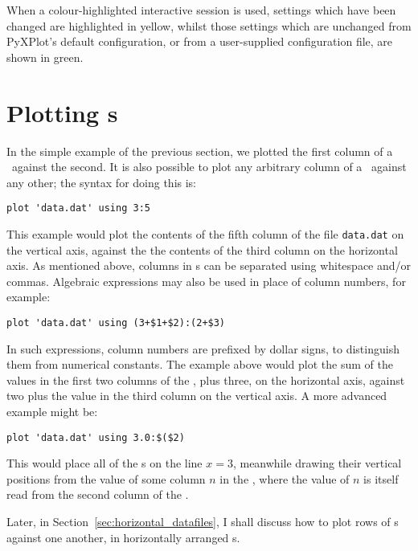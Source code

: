 When a colour-highlighted interactive session is used, settings which have been
changed are highlighted in yellow, whilst those settings which are unchanged
from PyXPlot's default configuration, or from a user-supplied configuration
file, are shown in green.

\section{Plotting \Datafile s}
\label{sec:plot_datafiles}

In the simple example of the previous section, we plotted the first column of a
\datafile\ against the second. It is also possible to plot any arbitrary column
of a \datafile\ against any other; the syntax for doing this is:

\begin{verbatim}
plot 'data.dat' using 3:5
\end{verbatim}

\noindent This example would plot the contents of the fifth column of the file
{\tt data.dat} on the vertical axis, against the the contents of the third
column on the horizontal axis. As mentioned above, columns in \datafile s can be
separated using whitespace and/or commas.  Algebraic expressions may also be
used in place of column numbers, for example:

\begin{verbatim}
plot 'data.dat' using (3+$1+$2):(2+$3)
\end{verbatim}

\noindent In such expressions, column numbers are prefixed by dollar signs, to
distinguish them from numerical constants. The example above would plot the sum
of the values in the first two columns of the \datafile, plus three, on the
horizontal axis, against two plus the value in the third column on the vertical
axis. A more advanced example might be:

\begin{verbatim}
plot 'data.dat' using 3.0:$($2)
\end{verbatim}

\noindent This would place all of the \datapoint s on the line $x=3$, meanwhile
drawing their vertical positions from the value of some column $n$ in the
\datafile, where the value of $n$ is itself read from the second column of the
\datafile.

Later, in Section~\ref{sec:horizontal_datafiles}, I shall discuss how to plot
rows of \datafile s against one another, in horizontally arranged \datafile s.

